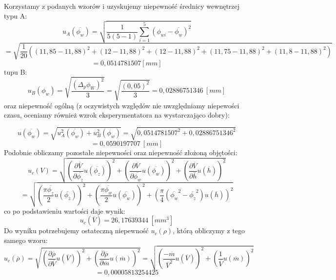 \documentclass{article}
\begin{document}
Korzystamy z podanych wzorów i uzyskujemy niepewność średnicy wewnętrzej typu A:
\begin{equation*}
   u_A(\overline{\phi_w}) = \sqrt{\frac{1}{5(5-1)}\sum_{i=1}^5 (\phi_{wi}-\overline{\phi_w})^2}
\end{equation*}
\begin{equation*}
   = \sqrt{\frac{1}{20} ((11,85-11,88)^2 + (12-11,88)^2 + (12-11,88)^2 + (11,75-11,88)^2 + (11,8-11,88)^2)} 
\end{equation*}
\begin{equation*}
    = 0,0514781507 [mm]
\end{equation*}
tupu B:
\begin{equation*}
    u_B(\phi_w) = \sqrt{\frac{(\Delta_p\phi_W)^2}{3}} 
    = \sqrt{\frac{(0,05)^2}{3}} = 0,02886751346 \ [mm]
\end{equation*}
oraz niepewność ogólną (z oczywistych względów nie uwzględniamy niepewości czasu, oceniamy również wzrok eksperymentatora na wystarczająco dobry): 

\begin{equation*}
    u(\overline{\phi_w}) = \sqrt{u_A^2(\overline{\phi_w}) + u_B^2(\phi_w) }
    = \sqrt{ 0,0514781507^2+ 0,02886751346^2 } 
\end{equation*}
\begin{equation*}= 0,0590197707\ [mm]
\end{equation*}
Podobnie obliczamy pozostałe niepewności oraz niepewność złożoną objętości:
\begin{equation*}
    u_c(V) = \sqrt{\left( \frac{\partial \overline{V}}{\partial \overline{\phi_z}} u(\overline{\phi_z})\right)^2 + \left(\frac{\partial \overline{V}}{\partial \overline{\phi_w}} u(\overline{\phi_w}) \right)^2 + \left(\frac{\partial \overline{V}}{\partial \overline{h}} u(\overline{h}) \right)^2} 
\end{equation*}
\begin{equation*}
    = \sqrt{\left( \frac{\pi\overline{\phi_z}}{2} u(\overline{\phi_z})\right)^2 + \left(\frac{\pi\overline{\phi_w}}{2} u(\overline{\phi_w})\right)^2 + \left(\frac{\pi}{4}(\overline{\phi_w}^2 - \overline{\phi_z}^2) u(\overline{h})\right)^2}
\end{equation*}
co po podstawieniu wartości daje wynik:
\begin{equation*}
    u_c(\overline{V}) = 26,17639344 \ [mm^3]
\end{equation*}
Do wyniku potrzebujemy ostateczną niepewność $u_c(\rho)$, którą obliczymy z tego samego wzoru:
\begin{equation*}
    u_c(\overline{\rho}) = \sqrt{\left( \frac{\partial \overline{\rho}}{\partial \overline{V}} u(\overline{V}) \right)^2 + \left( \frac{\partial \overline{\rho}}{\partial \overline{m}} u(\overline{m}) \right)^2 } 
    = \sqrt{\left( \frac{-\overline{m}}{\overline{V}^2} u(\overline{V}) \right)^2 + \left( \frac{1}{\overline{V}} u(\overline{m}) \right)^2 }
\end{equation*}
\begin{equation*}
    = 0,00005813254425
\end{equation*}
\end{document}

